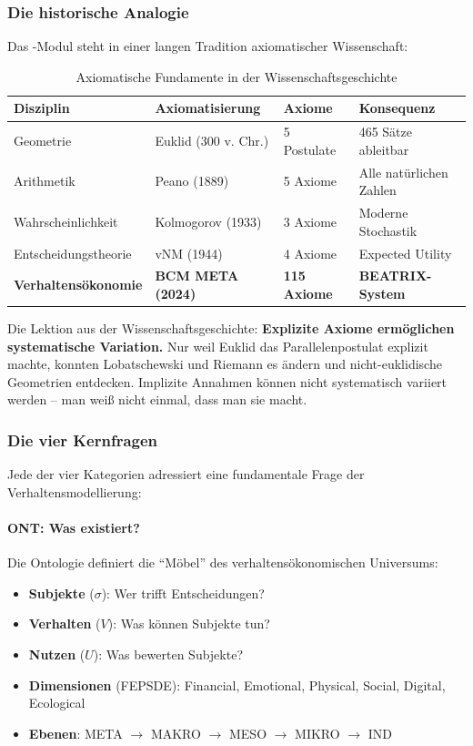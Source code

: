 \subsubsection{Die historische Analogie}

Das \META-Modul steht in einer langen Tradition axiomatischer Wissenschaft:

\begin{table}[h]
\centering
\caption{Axiomatische Fundamente in der Wissenschaftsgeschichte}
\begin{tabular}{@{}llll@{}}
\toprule
\textbf{Disziplin} & \textbf{Axiomatisierung} & \textbf{Axiome} & \textbf{Konsequenz} \\
\midrule
Geometrie & Euklid (300 v. Chr.) & 5 Postulate & 465 Sätze ableitbar \\
Arithmetik & Peano (1889) & 5 Axiome & Alle natürlichen Zahlen \\
Wahrscheinlichkeit & Kolmogorov (1933) & 3 Axiome & Moderne Stochastik \\
Entscheidungstheorie & vNM (1944) & 4 Axiome & Expected Utility \\
\textbf{Verhaltensökonomie} & \textbf{BCM META (2024)} & \textbf{115 Axiome} & \textbf{BEATRIX-System} \\
\bottomrule
\end{tabular}
\end{table}

Die Lektion aus der Wissenschaftsgeschichte: \textbf{Explizite Axiome ermöglichen systematische Variation.} Nur weil Euklid das Parallelenpostulat explizit machte, konnten Lobatschewski und Riemann es ändern und nicht-euklidische Geometrien entdecken. Implizite Annahmen können nicht systematisch variiert werden -- man weiß nicht einmal, dass man sie macht.

\subsubsection{Die vier Kernfragen}

Jede der vier Kategorien adressiert eine fundamentale Frage der Verhaltensmodellierung:

\paragraph{ONT: Was existiert?}
Die Ontologie definiert die ``Möbel'' des verhaltensökonomischen Universums:
\begin{itemize}
    \item \textbf{Subjekte} ($\sigma$): Wer trifft Entscheidungen?
    \item \textbf{Verhalten} ($V$): Was können Subjekte tun?
    \item \textbf{Nutzen} ($U$): Was bewerten Subjekte?
    \item \textbf{Dimensionen} (FEPSDE): Financial, Emotional, Physical, Social, Digital, Ecological
    \item \textbf{Ebenen}: META $\rightarrow$ MAKRO $\rightarrow$ MESO $\rightarrow$ MIKRO $\rightarrow$ IND
\end{itemize}

